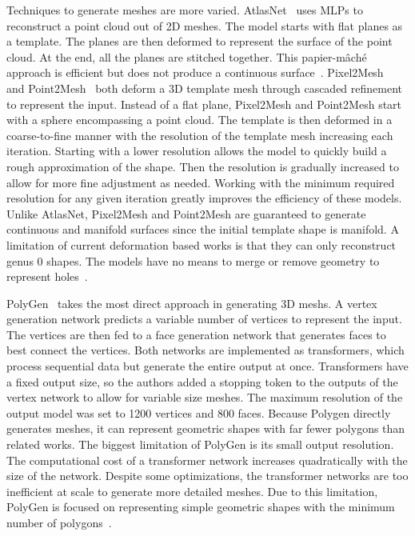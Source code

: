 Techniques to generate meshes are more varied. AtlasNet~\cite{Groueix2018} uses MLPs to reconstruct a point cloud out of 2D meshes. The model starts with flat planes  as a template. The planes are then deformed to represent the surface of the point cloud. At the end, all the planes are stitched together. This papier-m\^{a}ch\'{e} approach is efficient but does not produce a continuous surface~\cite{Groueix2018}. Pixel2Mesh~\cite{Wang2018} and Point2Mesh~\cite{Hanocka2020} both deform a 3D template mesh through cascaded refinement to represent the input. Instead of a flat plane, Pixel2Mesh and Point2Mesh start with a sphere encompassing a point cloud. The template is then deformed in a coarse-to-fine manner with the resolution of the template mesh increasing each iteration. Starting with a lower resolution allows the model to quickly build a rough approximation of the shape. Then the resolution is gradually increased to allow for more fine adjustment as needed. Working with the minimum required resolution for any given iteration greatly improves the efficiency of these models. Unlike AtlasNet, Pixel2Mesh and Point2Mesh are guaranteed to generate continuous and manifold surfaces since the initial template shape is manifold. A limitation of current deformation based works is that they can only reconstruct genus 0 shapes. The models have no means to merge or remove geometry to represent holes~\cite{Wang2018, Hanocka2020}.

PolyGen~\cite{Nash2020} takes the most direct approach in generating 3D meshs. A vertex generation network predicts a variable number of vertices to represent the input. The vertices are then fed to a face generation network that generates faces to best connect the vertices. Both networks are implemented as transformers, which process sequential data but generate the entire output at once. Transformers have a fixed output size, so the authors added a stopping token to the outputs of the vertex network to allow for variable size meshes. The maximum resolution of the output model was set to 1200 vertices and 800 faces. Because Polygen directly generates meshes, it can represent geometric shapes with far fewer polygons than related works. The biggest limitation of PolyGen is its small output resolution. The computational cost of a transformer network increases quadratically with the size of the network. Despite some optimizations, the transformer networks are too inefficient at scale to generate more detailed meshes. Due to this limitation, PolyGen is focused on representing simple geometric shapes with the minimum number of polygons~\cite{Nash2020}.



